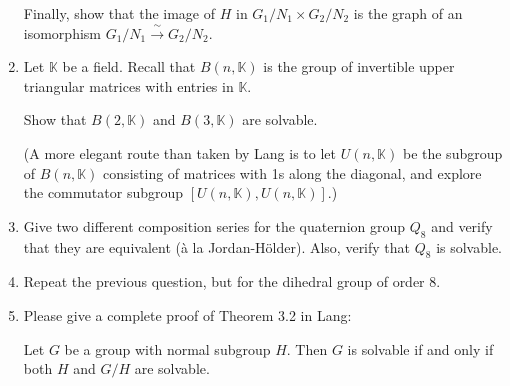 \documentclass[12pt]{article}
\newcommand{\KK}{{\mathbb K}}
\begin{document}
\begin{enumerate}
    Finally, show that the image of $H$ in $G_1/N_1 \times G_2/N_2$ is the graph of an isomorphism
    $G_1/N_1 \xrightarrow{\ \sim\ } G_2/N_2$.   
 
\item  Let $\KK$ be a field.
  Recall that $B(n,\KK)$ is the group of invertible upper triangular matrices with entries in $\KK$.

  Show that $B(2,\KK)$ and $B(3,\KK)$ are solvable.

  (A more elegant route than taken by Lang is to let $U(n,\KK)$ be the subgroup of $B(n,\KK)$ consisting of matrices with
  1s along the diagonal, and explore the commutator subgroup $[U(n,\KK), U(n,\KK)]$.)

 
\item 
  Give two different composition series for the quaternion group $Q_8$ and verify that they are equivalent
  (\`a la Jordan-H\"older).
  Also, verify that $Q_8$ is solvable.
    

\item
  Repeat the previous question, but for the dihedral group of order 8.

\item Please give a complete proof of Theorem 3.2 in Lang:

  Let $G$ be a group with normal subgroup $H$.
  Then $G$ is solvable if and only if both $H$ and $G/H$ are solvable.


      
\end{enumerate}
\end{document}

